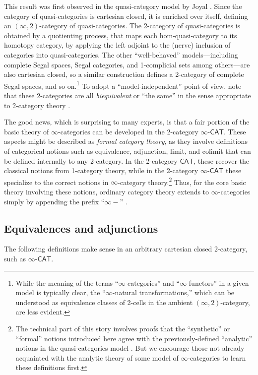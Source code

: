 \documentclass[11pt]{ctexart}
\theoremstyle{definition}
\theoremstyle{remark}
\numberwithin{equation}{section}
\newcommand{\CAT}{\mathsf{CAT}}
\newcommand{\ooCAT}{\infty\text{-}\mathsf{CAT}}
\newcommand{\1}{\mathbbe{1}}
\newcommand{\2}{\mathbbe{2}}
\newcommand{\3}{\mathbbe{3}}
\begin{document}
This result was first observed in the quasi-category model by Joyal \cite{joyal-theory}. Since the category of quasi-categories is cartesian closed, it is enriched over itself, defining an $(\infty,2)$-category of quasi-categories. The 2-category of quasi-categories is obtained by a quotienting process, that maps each hom-quasi-category to its homotopy category, by applying the left adjoint to the (nerve) inclusion of categories into quasi-categories. The other ``well-behaved'' models---including complete Segal spaces, Segal categories, and 1-complicial sets among others---are also cartesian closed, so a similar construction defines a 2-category of complete Segal spaces, and so on.\footnote{While the meaning of the terms ``$\infty$-categories'' and ``$\infty$-functors'' in a given model is typically clear, the ``$\infty$-natural transformations,'' which can be understood as equivalence classes of 2-cells in the ambient $(\infty,2)$-category, are less evident.} To adopt a ``model-independent'' point of view, note that these 2-categories are all \emph{biequivalent} or ``the same'' in the sense appropriate to 2-category theory \cite[\S E.2]{RV}.

The good news, which is surprising to many experts, is that a fair portion of the basic theory of $\infty$-categories can be developed in the 2-category $\ooCAT$. These aspects might be described as \emph{formal category theory}, as they involve definitions of categorical notions such as equivalence, adjunction, limit, and colimit that can be defined internally to any 2-category. In the 2-category $\CAT$, these recover the classical notions from 1-category theory, while in the 2-category $\ooCAT$ these specialize to the correct notions in $\infty$-category theory.\footnote{The technical part of this story involves proofs that the ``synthetic'' or ``formal'' notions introduced here agree with the previously-defined ``analytic'' notions in the quasi-categories model  \cite[\S F]{RV}. But we encourage those not already acquainted with the analytic theory of some model of $\infty$-categories to learn these definitions first.} Thus, for the core basic theory involving these notions, ordinary category theory extends to $\infty$-categories simply by appending the prefix ``$\infty-$'' \cite[\S2-4]{RV}.

\subsection*{Equivalences and adjunctions}

The following definitions make sense in an arbitrary cartesian closed 2-category, such as  $\ooCAT$.
\end{document}
